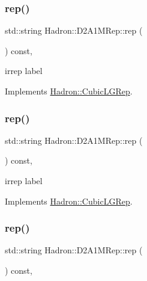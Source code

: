 \subsubsection{\texorpdfstring{rep()}{rep()}\hspace{0.1cm}{\footnotesize\ttfamily [1/3]}}
{\footnotesize\ttfamily std\+::string Hadron\+::\+D2\+A1\+M\+Rep\+::rep (\begin{DoxyParamCaption}{ }\end{DoxyParamCaption}) const\hspace{0.3cm}{\ttfamily [inline]}, {\ttfamily [virtual]}}

irrep label 

Implements \mbox{\hyperlink{structHadron_1_1CubicLGRep_a50f5ddbb8f4be4cee0106fa9e8c75e6c}{Hadron\+::\+Cubic\+L\+G\+Rep}}.

\mbox{\label{structHadron_1_1D2A1MRep_ae86f915110783280c85121414a31e18f}} 
\subsubsection{\texorpdfstring{rep()}{rep()}\hspace{0.1cm}{\footnotesize\ttfamily [2/3]}}
{\footnotesize\ttfamily std\+::string Hadron\+::\+D2\+A1\+M\+Rep\+::rep (\begin{DoxyParamCaption}{ }\end{DoxyParamCaption}) const\hspace{0.3cm}{\ttfamily [inline]}, {\ttfamily [virtual]}}

irrep label 

Implements \mbox{\hyperlink{structHadron_1_1CubicLGRep_a50f5ddbb8f4be4cee0106fa9e8c75e6c}{Hadron\+::\+Cubic\+L\+G\+Rep}}.

\mbox{\label{structHadron_1_1D2A1MRep_ae86f915110783280c85121414a31e18f}} 
\subsubsection{\texorpdfstring{rep()}{rep()}\hspace{0.1cm}{\footnotesize\ttfamily [3/3]}}
{\footnotesize\ttfamily std\+::string Hadron\+::\+D2\+A1\+M\+Rep\+::rep (\begin{DoxyParamCaption}{ }\end{DoxyParamCaption}) const\hspace{0.3cm}{\ttfamily [inline]}, {\ttfamily [virtual]}}

